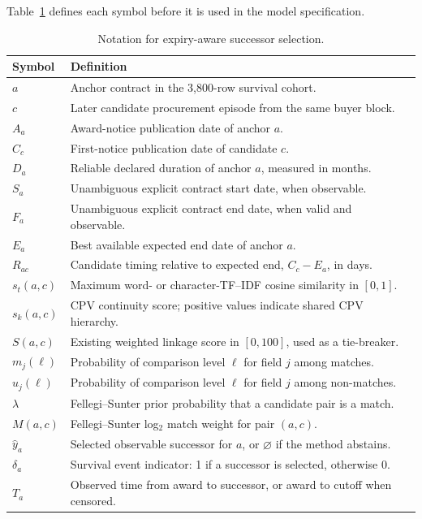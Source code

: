 \documentclass[11pt,a4paper]{article}
\begin{document}
Table~\ref{tab:notation} defines each symbol before it is used in the model
specification.

\begin{table}[H]
\centering
\caption{Notation for expiry-aware successor selection.}
\label{tab:notation}
\small
\begin{tabularx}{\textwidth}{p{2.6cm}X}
\toprule
\textbf{Symbol} & \textbf{Definition} \\
\midrule
$a$ & Anchor contract in the 3,800-row survival cohort. \\
$c$ & Later candidate procurement episode from the same buyer block. \\
$A_a$ & Award-notice publication date of anchor $a$. \\
$C_c$ & First-notice publication date of candidate $c$. \\
$D_a$ & Reliable declared duration of anchor $a$, measured in months. \\
$S_a$ & Unambiguous explicit contract start date, when observable. \\
$F_a$ & Unambiguous explicit contract end date, when valid and observable. \\
$E_a$ & Best available expected end date of anchor $a$. \\
$R_{ac}$ & Candidate timing relative to expected end, $C_c-E_a$, in days. \\
$s_t(a,c)$ & Maximum word- or character-TF--IDF cosine similarity in $[0,1]$. \\
$s_k(a,c)$ & CPV continuity score; positive values indicate shared CPV hierarchy. \\
$S(a,c)$ & Existing weighted linkage score in $[0,100]$, used as a tie-breaker. \\
$m_j(\ell)$ & Probability of comparison level $\ell$ for field $j$ among matches. \\
$u_j(\ell)$ & Probability of comparison level $\ell$ for field $j$ among non-matches. \\
$\lambda$ & Fellegi--Sunter prior probability that a candidate pair is a match. \\
$M(a,c)$ & Fellegi--Sunter log$_2$ match weight for pair $(a,c)$. \\
$\widehat{y}_a$ & Selected observable successor for $a$, or $\varnothing$ if the method abstains. \\
$\delta_a$ & Survival event indicator: 1 if a successor is selected, otherwise 0. \\
$T_a$ & Observed time from award to successor, or award to cutoff when censored. \\
\bottomrule
\end{tabularx}
\end{table}
\end{document}
